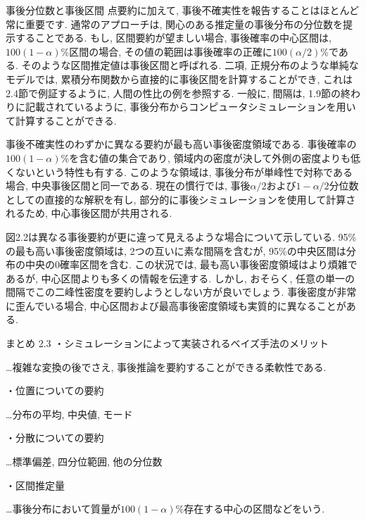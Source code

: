\documentclass[10pt,dvipdfmx,a4]{beamer}
\begin{document}
\begin{frame}{事後分位数と事後区間}
点要約に加えて, 事後不確実性を報告することはほとんど常に重要です.
通常のアプローチは, 関心のある推定量の事後分布の分位数を提示することである.
もし, 区間要約が望ましい場合, 事後確率の中心区間は, $100(1-\alpha)$\%区間の場合,  その値の範囲は事後確率の正確に$100(\alpha/2)$\%である.
そのような区間推定値は事後区間と呼ばれる.
二項, 正規分布のような単純なモデルでは, 累積分布関数から直接的に事後区間を計算することができ, これは2.4節で例証するように, 人間の性比の例を参照する.
一般に, 間隔は, 1.9節の終わりに記載されているように, 事後分布からコンピュータシミュレーションを用いて計算することができる.

事後不確実性のわずかに異なる要約が最も高い事後密度領域である.
事後確率の$100(1-\alpha)$\%を含む値の集合であり, 領域内の密度が決して外側の密度よりも低くないという特性も有する.
このような領域は, 事後分布が単峰性で対称である場合, 中央事後区間と同一である.
現在の慣行では, 事後$\alpha/2$および$1-\alpha/2$分位数としての直接的な解釈を有し, 部分的に事後シミュレーションを使用して計算されるため, 中心事後区間が共用される.
\end{frame}


\begin{frame}
図2.2は異なる事後要約が更に違って見えるような場合について示している.
95\%の最も高い事後密度領域は, 2つの互いに素な間隔を含むが, 95\%の中央区間は分布の中央の0確率区間を含む.
この状況では, 最も高い事後密度領域はより煩雑であるが, 中心区間よりも多くの情報を伝達する.
しかし, おそらく, 任意の単一の間隔でこの二峰性密度を要約しようとしない方が良いでしょう.
事後密度が非常に歪んでいる場合, 中心区間および最高事後密度領域も実質的に異なることがある.
\end{frame}


\begin{frame}[t]{まとめ 2.3}
・シミュレーションによって実装されるベイズ手法のメリット

…複雑な変換の後でさえ, 事後推論を要約することができる柔軟性である.

・位置についての要約

…分布の平均, 中央値, モード

・分散についての要約

…標準偏差, 四分位範囲, 他の分位数

・区間推定量

…事後分布において質量が$100(1-\alpha)\%$存在する中心の区間などをいう.
\end{frame}
\end{document}

